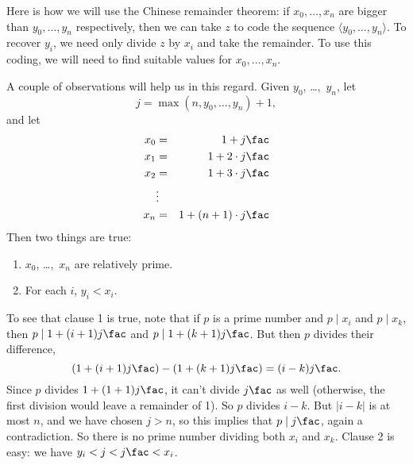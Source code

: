 \documentclass[../../include/open-logic-section]{subfiles}
\begin{document}
Here is how we will use the Chinese remainder theorem: if
$x_0,\dots,x_n$ are bigger than $y_0,\dots,y_n$ respectively, then
we can take $z$ to code the sequence $\langle y_0,\dots,y_n\rangle$. To recover
$y_i$, we need only divide $z$ by $x_i$ and take the remainder. To use
this coding, we will need to find suitable values for $x_0,\dots,x_n$.

A couple of observations will help us in this regard. Given
$y_0$, \dots,~$y_n$, let
\[
j = \max(n,y_0,\dots,y_n)+1,
\] 
and let
\begin{eqnarray*}
x_0 & = & 1 + j\fac \\
x_1 & = & 1 + 2\cdot j\fac \\
x_2 & = & 1 + 3\cdot j\fac \\
& \vdots & \\
x_n & = & 1 + (n+1) \cdot j\fac
\end{eqnarray*}
Then two things are true:
\begin{enumerate}
\item $x_0$, \dots,~$x_n$ are relatively prime.
\item For each $i$, $y_i < x_i$.
\end{enumerate}
To see that clause 1 is true, note that if $p$ is a prime number and
$p \mid x_i$ and $p \mid x_k$, then $p \mid 1 + (i+1) j\fac$ and $p \mid 1 + (k+1)
j\fac$. But then $p$ divides their difference,
\[
(1 + (i+1)j\fac) - (1+ (k+1)j\fac) = (i-k) j\fac.
\]
Since $p$ divides $1 + (1+1)j\fac$, it can't divide $j\fac$ as well
(otherwise, the first division would leave a remainder of 1). So $p$
divides $i-k$. But $\left| i-k \right|$ is at most $n$, and we have
chosen $j > n$, so this implies that $p \mid j\fac$, again a
contradiction. So there is no prime number dividing both $x_i$ and
$x_k$. Clause 2 is easy: we have $y_i < j < j\fac < x_i$.
\end{document}
